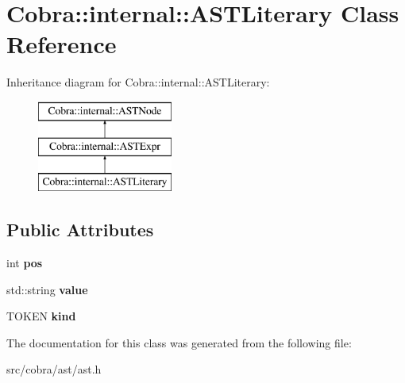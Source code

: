 \hypertarget{class_cobra_1_1internal_1_1_a_s_t_literary}{\section{Cobra\+:\+:internal\+:\+:A\+S\+T\+Literary Class Reference}
\label{class_cobra_1_1internal_1_1_a_s_t_literary}
}
Inheritance diagram for Cobra\+:\+:internal\+:\+:A\+S\+T\+Literary\+:\begin{figure}[H]
\begin{center}
\leavevmode
\includegraphics[height=3.000000cm]{class_cobra_1_1internal_1_1_a_s_t_literary}
\end{center}
\end{figure}
\subsection*{Public Attributes}
\begin{DoxyCompactItemize}
\item 
\hypertarget{class_cobra_1_1internal_1_1_a_s_t_literary_ab3070fdd1d7d1c311a08c66a5ee3d595}{int {\bfseries pos}}\label{class_cobra_1_1internal_1_1_a_s_t_literary_ab3070fdd1d7d1c311a08c66a5ee3d595}

\item 
\hypertarget{class_cobra_1_1internal_1_1_a_s_t_literary_a15748fbb3c828911da66b91924ca6b38}{std\+::string {\bfseries value}}\label{class_cobra_1_1internal_1_1_a_s_t_literary_a15748fbb3c828911da66b91924ca6b38}

\item 
\hypertarget{class_cobra_1_1internal_1_1_a_s_t_literary_ae73b054aee4668feebb7cfe435a5393b}{T\+O\+K\+E\+N {\bfseries kind}}\label{class_cobra_1_1internal_1_1_a_s_t_literary_ae73b054aee4668feebb7cfe435a5393b}

\end{DoxyCompactItemize}


The documentation for this class was generated from the following file\+:\begin{DoxyCompactItemize}
\item 
src/cobra/ast/ast.\+h\end{DoxyCompactItemize}
